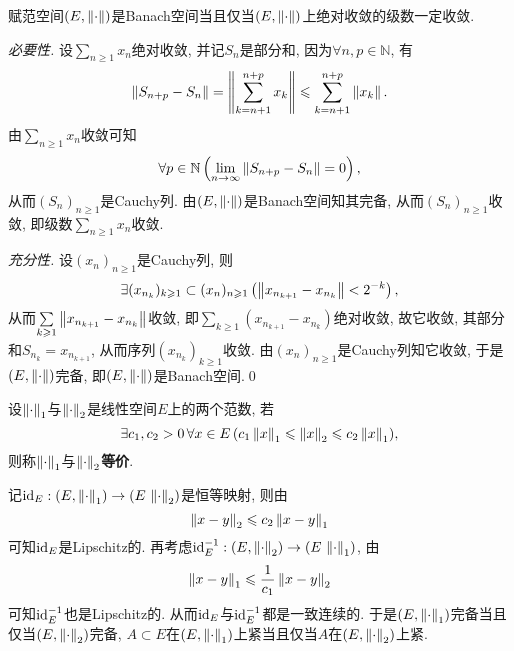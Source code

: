 	\begin{Theorem}
	赋范空间$ (E,\left\| \cdot \right\|) $是Banach空间当且仅当$ (E,\left\| \cdot \right\|) $上绝对收敛的级数一定收敛.
	\end{Theorem}
	\begin{Proof}
	\textsl{必要性.} 设$ \sum\limits_{n\geqslant 1}x_n $绝对收敛, 并记$ S_n $是部分和, 因为$ \forall n,p\in\mathbb{N} $, 有
	\[
	\left\| S_{n+p}-S_n \right\|=\left\| \sum_{k=n+1}^{n+p}x_k \right\|\leqslant\sum_{k=n+1}^{n+p}\left\| x_k \right\|.
	\]
	由$ \sum\limits_{n\geqslant 1}x_n $收敛可知
	\[
	\forall p\in\mathbb{N}\left(\lim_{n\to\infty}\left\| S_{n+p}-S_n \right\|=0\right),
	\]
	从而$ (S_n)_{n\geqslant 1} $是Cauchy列. 由$ (E,\left\| \cdot \right\|) $是Banach空间知其完备, 从而$ (S_n)_{n\geqslant 1} $收敛, 即级数$ \sum\limits_{n\geqslant 1}x_n $收敛.

	\textsl{充分性.} 设$ (x_n)_{n\geqslant 1} $是Cauchy列, 则
	\[
	\exists(x_{n_k})_{k\geqslant 1}\subset(x_n)_{n\geqslant 1}\left(\left\| x_{n_{k+1}}-x_{n_k} \right\|<2^{-k}\right),
	\]
	从而$ \sum\limits_{k\geqslant 1}\left\| x_{n_{k+1}}-x_{n_k} \right\| $收敛, 即$ \sum\limits_{k\geqslant 1}(x_{n_{k+1}}-x_{n_k}) $绝对收敛, 故它收敛, 其部分和$ S_{n_k}=x_{n_{k+1}} $, 从而序列$ (x_{n_k})_{k\geqslant 1} $收敛. 由$ (x_n)_{n\geqslant 1} $是Cauchy列知它收敛, 于是$ (E,\left\| \cdot \right\|) $完备, 即$ (E,\left\| \cdot \right\|) $是Banach空间.\qed
	\end{Proof}

	\begin{Definition}[范数等价]
		设$ \left\| \cdot \right\|_1 $与$ \left\| \cdot \right\|_2 $是线性空间$ E $上的两个范数, 若
		\[
		\exists c_1,c_2>0\,\forall x\in E\,(c_1\left\| x \right\|_1\leqslant\left\| x \right\|_2\leqslant c_2\left\| x \right\|_1),
		\]
		则称$ \left\| \cdot \right\|_1 $与$ \left\| \cdot \right\|_2 $\textbf{等价}.
	\end{Definition}

	\begin{Remark}
	记$ \mathrm{id}_E : (E,\left\| \cdot \right\|_1)\to(E\,\left\| \cdot \right\|_2) $是恒等映射, 则由
	\[
	\left\| x-y \right\|_2\leqslant c_2\left\| x-y \right\|_1
	\]
	可知$ \mathrm{id}_E $是Lipschitz的. 再考虑$ \mathrm{id}_E^{-1} : (E,\left\| \cdot \right\|_2)\to(E\,\left\| \cdot \right\|_1) $, 由
	\[
	\left\| x-y \right\|_1\leqslant\frac{1}{c_1}\left\| x-y \right\|_2
	\]
	可知$ \mathrm{id}_E^{-1} $也是Lipschitz的. 从而$ \mathrm{id}_E $与$ \mathrm{id}_E^{-1} $都是一致连续的. 于是$ (E,\left\| \cdot \right\|_1) $完备当且仅当$ (E,\left\| \cdot \right\|_2) $完备, $ A\subset E $在$ (E,\left\| \cdot \right\|_1) $上紧当且仅当$ A $在$ (E,\left\| \cdot \right\|_2) $上紧.
	\end{Remark}

